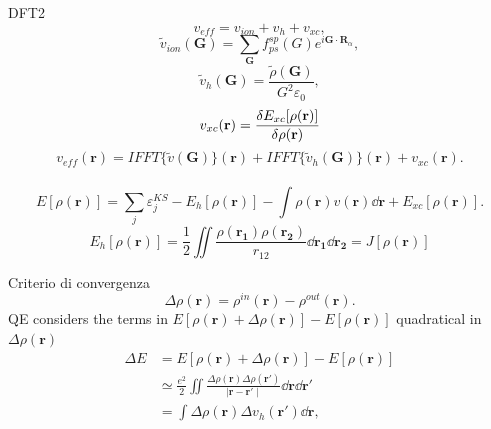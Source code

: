 \documentclass[8pt]{beamer}
\newcommand\mf[1]{\mathbf{#1}}
\newcommand\dens{\rho(\mathbf{r})}
\newcommand\densin{\rho^{in}(\mathbf{r})}
\newcommand\densout{\rho^{out}(\mathbf{r})}
\newcommand\erre{\mathbf{r}}
\begin{document}
\begin{frame}{DFT2}
\begin{equation}
	v_{eff} = v_{ion} + v_{h} + v_{xc},
\end{equation}
\begin{equation}
	\tilde{v}_{ion}(\mf{G}) = \sum_{\mf{G}} f_{ps}^{sp}(G) e^{i \mf{G} \cdot \mf{R}_{\alpha}},
\end{equation}
\begin{equation}
	\tilde{v}_{h}(\mf{G}) = \frac{\tilde{\rho}(\mf{G})}{G^2 \varepsilon_{0}},
\end{equation}
\begin{equation}
	v_{xc}(\erre) =	\frac{\var{E_{xc}[\dens]}}{\var{\dens}}
\end{equation}
\begin{equation}
	v_{eff}(\erre) = IFFT\{\tilde{v}(\mf{G})\}(\erre) + IFFT\{\tilde{v}_{h}(\mf{G})\}(\erre) + v_{xc}(\erre).
\end{equation}
\\
\begin{equation}
	E[\dens] = \sum_{j}\varepsilon^{KS}_{j} - E_{h}[\dens] - \int \dens v(\erre) \dd{\erre}+ E_{xc}[\dens].
\end{equation}
\begin{equation}\label{eq:HartreeEnergy}
E_{h}[\dens] = \frac{1}{2} \iint \frac{\rho(\mathbf{r_{1}}) \rho(\mathbf{r_{2}}) }{r_{12}} \dd{\mathbf{r_1}} \dd{\mathbf{r_2}} = J[\dens]
\end{equation}


\end{frame}



\begin{frame}{Criterio di convergenza}
\begin{equation}
	\Delta\dens = \densin - \densout.
\end{equation}
QE considers the terms in $E[\dens + \Delta\dens] - E[\dens ]$ quadratical in $\Delta\dens$ 
\begin{align}
	\Delta E &= E[\dens + \Delta\dens] - E[\dens ] \\
	&\simeq \frac{e^2}{2} \iint \frac{\Delta\rho(\erre) \Delta\rho(\erre')}{\mid \erre - \erre' \mid} \dd{\erre} \dd{\erre'}\\
	 &= \int \Delta\dens \Delta v_{h}(\erre') \dd{\erre},
\end{align}

\end{frame}
\end{document}
